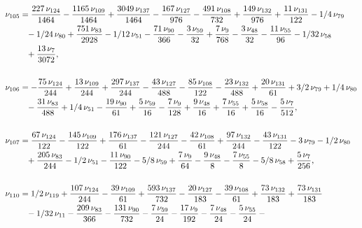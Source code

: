 \documentclass[a4paper,12pt, DIV=14, BCOR=5mm, twoside, headsepline, numbers=noenddot]{scrbook}
\begin{document}
\begin{align}\label{AreaSol10}
\begin{aligned}
\nu_{{105}}&={\frac {227\,\nu_{{124}}}{1464}}-{\frac {1165
\,\nu_{{109}}}{1464}}+{\frac {3049\,\nu_{{137}}}{1464}}-{\frac {167\,
\nu_{{127}}}{976}}-{\frac {491\,\nu_{{108}}}{732}}+{\frac {149\,\nu_{{
132}}}{976}}+{\frac {11\,\nu_{{131}}}{122}}-1/4\,\nu_{{79}}\\
 &\hphantom{=}-1/24\,\nu_
{{80}}+{\frac {751\,\nu_{{83}}}{2928}}-1/12\,\nu_{{51}}-{\frac {71\,
\nu_{{90}}}{366}}-{\frac {3\,\nu_{{59}}}{32}}+{\frac {7\,\nu_{{9}}}{
768}}-{\frac {3\,\nu_{{48}}}{32}}-{\frac {11\,\nu_{{55}}}{96}}-1/32\,
\nu_{{58}}\\
 &\hphantom{=}+{\frac {13\,\nu_{{7}}}{3072}},\\
\\
\nu_{{106}}&=-{\frac {75\,\nu_
{{124}}}{244}}+{\frac {13\,\nu_{{109}}}{244}}+{\frac {297\,\nu_{{137}}
}{244}}-{\frac {43\,\nu_{{127}}}{488}}-{\frac {85\,\nu_{{108}}}{122}}-
{\frac {23\,\nu_{{132}}}{488}}+{\frac {20\,\nu_{{131}}}{61}}+3/2\,\nu_
{{79}}+1/4\,\nu_{{80}}\\
 &\hphantom{=}-{\frac {31\,\nu_{{83}}}{488}}+1/4\,\nu_{{51}}-{
\frac {19\,\nu_{{90}}}{61}}+{\frac {5\,\nu_{{59}}}{16}}-{\frac {7\,\nu
_{{9}}}{128}}+{\frac {9\,\nu_{{48}}}{16}}+{\frac {7\,\nu_{{55}}}{16}}+
{\frac {5\,\nu_{{58}}}{16}}-{\frac {5\,\nu_{{7}}}{512}}, \\
\\
\nu_{{107}}&={
\frac {67\,\nu_{{124}}}{122}}-{\frac {145\,\nu_{{109}}}{122}}+{\frac {
176\,\nu_{{137}}}{61}}-{\frac {121\,\nu_{{127}}}{244}}-{\frac {42\,\nu
_{{108}}}{61}}+{\frac {97\,\nu_{{132}}}{244}}-{\frac {43\,\nu_{{131}}
}{122}}-3\,\nu_{{79}}-1/2\,\nu_{{80}}\\
 &\hphantom{=}+{\frac {205\,\nu_{{83}}}{244}}-1
/2\,\nu_{{51}}-{\frac {11\,\nu_{{90}}}{122}}-5/8\,\nu_{{59}}+{\frac {7
\,\nu_{{9}}}{64}}-{\frac {9\,\nu_{{48}}}{8}}-{\frac {7\,\nu_{{55}}}{8}
}-5/8\,\nu_{{58}}+{\frac {5\,\nu_{{7}}}{256}}, \\
\\
\nu_{{110}}&=1/2\,\nu_{{
119}}+{\frac {107\,\nu_{{124}}}{244}}-{\frac {39\,\nu_{{109}}}{61}}+{
\frac {593\,\nu_{{137}}}{732}}-{\frac {20\,\nu_{{127}}}{183}}-{\frac {
39\,\nu_{{108}}}{61}}+{\frac {73\,\nu_{{132}}}{183}}+{\frac {73\,\nu_{
{131}}}{183}}\\
 &\hphantom{=}-1/32\,\nu_{{11}}-{\frac {209\,\nu_{{83}}}{366}}-{\frac {
131\,\nu_{{90}}}{732}}-{\frac {7\,\nu_{{59}}}{24}}-{\frac {17\,\nu_{{9
}}}{192}}-{\frac {7\,\nu_{{48}}}{24}}-{\frac {5\,\nu_{{55}}}{24}}-{
}
\end{aligned}
\end{align}
\end{document}
